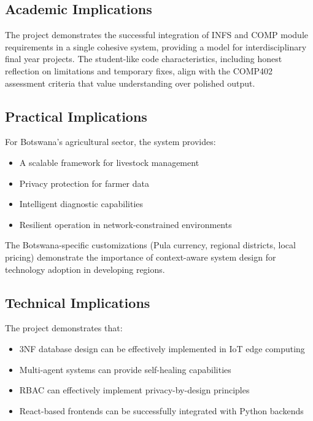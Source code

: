\subsection{Academic Implications}

The project demonstrates the successful integration of INFS and COMP module requirements in a single cohesive system, providing a model for interdisciplinary final year projects. The student-like code characteristics, including honest reflection on limitations and temporary fixes, align with the COMP402 assessment criteria that value understanding over polished output.

\subsection{Practical Implications}

For Botswana's agricultural sector, the system provides:

\begin{itemize}
    \item A scalable framework for livestock management
    \item Privacy protection for farmer data
    \item Intelligent diagnostic capabilities
    \item Resilient operation in network-constrained environments
\end{itemize}

The Botswana-specific customizations (Pula currency, regional districts, local pricing) demonstrate the importance of context-aware system design for technology adoption in developing regions.

\subsection{Technical Implications}

The project demonstrates that:

\begin{itemize}
    \item 3NF database design can be effectively implemented in IoT edge computing
    \item Multi-agent systems can provide self-healing capabilities
    \item RBAC can effectively implement privacy-by-design principles
    \item React-based frontends can be successfully integrated with Python backends
\end{itemize}

